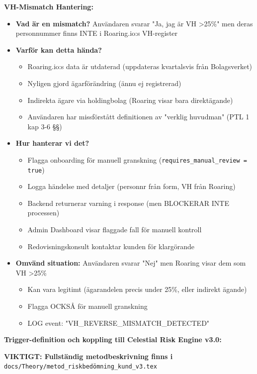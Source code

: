 \documentclass[12pt,a4paper]{article}
\begin{document}
\textbf{VH-Mismatch Hantering:}
\begin{itemize}[noitemsep]
  \item \textbf{Vad är en mismatch?} Användaren svarar "Ja, jag är VH >25\%" men deras personnummer finns INTE i Roaring.io:s VH-register
  \item \textbf{Varför kan detta hända?}
    \begin{itemize}[noitemsep]
      \item Roaring.io:s data är utdaterad (uppdateras kvartalsvis från Bolagsverket)
      \item Nyligen gjord ägarförändring (ännu ej registrerad)
      \item Indirekta ägare via holdingbolag (Roaring visar bara direktägande)
      \item Användaren har missförstått definitionen av "verklig huvudman" (PTL 1 kap 3-6 §§)
    \end{itemize}
  \item \textbf{Hur hanterar vi det?}
    \begin{itemize}[noitemsep]
      \item Flagga onboarding för manuell granskning (\texttt{requires\_manual\_review = true})
      \item Logga händelse med detaljer (personnr från form, VH från Roaring)
      \item Backend returnerar varning i response (men BLOCKERAR INTE processen)
      \item Admin Dashboard visar flaggade fall för manuell kontroll
      \item Redovisningskonsult kontaktar kunden för klargörande
    \end{itemize}
  \item \textbf{Omvänd situation:} Användaren svarar "Nej" men Roaring visar dem som VH >25\%
    \begin{itemize}[noitemsep]
      \item Kan vara legitimt (ägarandelen precis under 25\%, eller indirekt ägande)
      \item Flagga OCKSÅ för manuell granskning
      \item LOG event: "VH\_REVERSE\_MISMATCH\_DETECTED"
    \end{itemize}
\end{itemize}

\textbf{Trigger-definition och koppling till Celestial Risk Engine v3.0:}

\textbf{VIKTIGT: Fullständig metodbeskrivning finns i} \texttt{docs/Theory/metod\_riskbedömning\_kund\_v3.tex}
\end{document}
